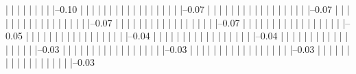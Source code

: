             |          |          |          |          |          |          |          |          |--0.10%
            |          |          |          |          |          |          |          |          |          
            |          |          |          |          |          |          |          |          |--0.07%
            |          |          |          |          |          |          |          |          |          
            |          |          |          |          |          |          |          |          |--0.07%
            |          |          |          |          |          |          |          |          |          
            |          |          |          |          |          |          |          |          |--0.07%
            |          |          |          |          |          |          |          |          |          
            |          |          |          |          |          |          |          |          |--0.07%
            |          |          |          |          |          |          |          |          |          
            |          |          |          |          |          |          |          |          |--0.05%
            |          |          |          |          |          |          |          |          |          
            |          |          |          |          |          |          |          |          |--0.04%
            |          |          |          |          |          |          |          |          |          
            |          |          |          |          |          |          |          |          |--0.04%
            |          |          |          |          |          |          |          |          |          
            |          |          |          |          |          |          |          |          |--0.03%
            |          |          |          |          |          |          |          |          |          
            |          |          |          |          |          |          |          |          |--0.03%
            |          |          |          |          |          |          |          |          |          
            |          |          |          |          |          |          |          |          |--0.03%
            |          |          |          |          |          |          |          |          |          
            |          |          |          |          |          |          |          |          |--0.03%
